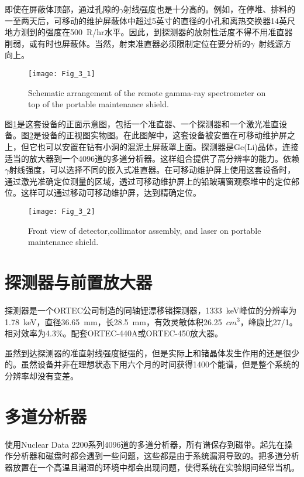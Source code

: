 即使在屏蔽体顶部，通过孔隙的$\gamma$射线强度也是十分高的。例如，在停堆、排料的一至两天后，可移动的维护屏蔽体中超过5英寸的直径的小孔和离热交换器14英尺地方测到的强度在500\ R/hr水平。因此，到探测器的放射性活度不得不用准直器削弱，或有时也屏蔽体。当然，射束准直器必须限制定位在要分析的$\gamma$\ 射线源方向上。

\begin{figure}
\centering
\texttt{[image: Fig\_3\_1]}
\caption{Schematic arrangement of the remote gamma-ray spectrometer on top of the portable maintenance shield.}
\label{Fig_3_1}
\end{figure}
图\ref{Fig_3_1}是这套设备的正面示意图，包括一个准直器、一个探测器和一个激光准直设备。图\ref{Fig_3_2}是设备的正视图实物图。在此图解中，这套设备被安置在可移动维护屏之上，但它也可以安置在钻有小洞的混泥土屏蔽罩上面。探测器是Ge(Li)晶体，连接适当的放大器到一个4096道的多道分析器。这样组合提供了高分辨率的能力。依赖$\gamma$射线强度，可以选择不同的嵌入式准直器。在可移动维护屏上使用这套设备时，通过激光准确定位测量的区域，透过可移动维护屏上的铅玻璃窗观察堆中的定位部位。这样可以通过移动可移动维护屏，达到精确定位。

\begin{figure}
\centering
\texttt{[image: Fig\_3\_2]}
\caption{Front view of detector,collimator assembly, and laser on portable maintenance shield.}
\label{Fig_3_2}
\end{figure}

\section{探测器与前置放大器}
探测器是一个ORTEC公司制造的同轴锂漂移锗探测器，1333\ keV峰位的分辨率为1.78\ keV，直径36.65\ mm，长28.5\ mm，有效灵敏体积26.25\ $cm^3$，峰康比27/1。相对效率为4.3\%。配套ORTEC-440A或ORTEC-450放大器。

虽然到达探测器的准直射线强度挺强的，但是实际上和锗晶体发生作用的还是很少的。虽然设备并非在理想状态下用六个月的时间获得1400个能谱，但是整个系统的分辨率却没有变差。

\section{多道分析器}

使用Nuclear Data 2200系列4096道的多道分析器，所有谱保存到磁带。起先在操作分析器和磁盘时都会遇到一些问题，这些都是由于系统漏洞导致的。把多道分析器放置在一个高温且潮湿的环境中都会出现问题，使得系统在实验期间经常当机。


